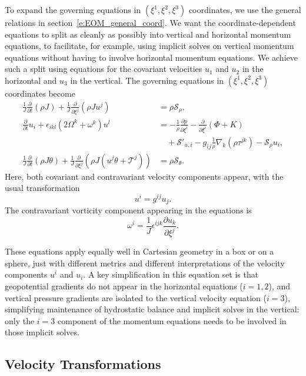 \documentclass{report}
\begin{document}
To expand the governing equations in $(\xi^1, \xi^2, \xi^3)$ coordinates, we use the general relations in section~\ref{e:EOM_general_coord}. We want the coordinate-dependent equations to split as cleanly as possibly into vertical and horizontal momentum equations, to facilitate, for example, using implicit solves on vertical momentum equations without having to involve horizontal momentum equations. We achieve such a split using equations for the covariant velocities $u_1$ and $u_2$ in the horizontal and $u_3$ in the vertical. The governing equations in  $(\xi^1, \xi^2, \xi^3)$ coordinates become
\begin{subequations}
\begin{align}\label{e:equations_coord_hor_vert}
 \frac{1}{J} \frac{\partial}{\partial t}  (\rho J) + \frac{1}{J} \frac{\partial}{\partial \xi^j} \left(\rho J u^j\right)
    & = \rho \mathcal{S}_\rho,\\
    \frac{\partial}{\partial t} u_i + \epsilon_{ikl} (2\Omega^k + \omega^k) u^l 
    &=  -\frac{1}{\rho} \frac{\partial p}{\partial\xi^i} 
   -  \frac{\partial}{\partial \xi^i} (\Phi + K) \\
    & \quad + \mathcal{S}'_{u, i} - g_{ij} \frac{1}{\rho} \nabla_k (\rho \tau^{jk}) - \mathcal{S}_\rho u_i,\\
        \frac{1}{J} \frac{\partial}{\partial t}  (\rho J \theta) + \frac{1}{J} \frac{\partial}{\partial \xi^j} \left(\rho J (u^j \theta + \mathcal{T}^j)\right)
    & = \rho \mathcal{S}_\theta.
\end{align}
\end{subequations}
Here, both covariant and contravariant velocity components appear, with the usual transformation
\[
u^i = g^{ij} u_j.
\]
The contravariant vorticity component appearing in the equations is 
\[
\omega^i = \frac{1}{J} \epsilon^{ijk} \frac{\partial u_k}{\partial \xi^j}.
\]

These equations apply equally well in Cartesian geometry in a box or on a sphere, just with different metrics and different interpretations of the velocity components $u^i$ and $u_i$. A key simplification in this equation set is that geopotential gradients do not appear in the horizontal equations ($i=1, 2$), and vertical pressure gradients are isolated to the vertical velocity equation ($i=3$), simplifying maintenance of hydrostatic balance and implicit solves in the vertical: only the $i=3$ component of the momentum equations needs to be involved in those implicit solves.

\subsection{Velocity Transformations}
\end{document}
